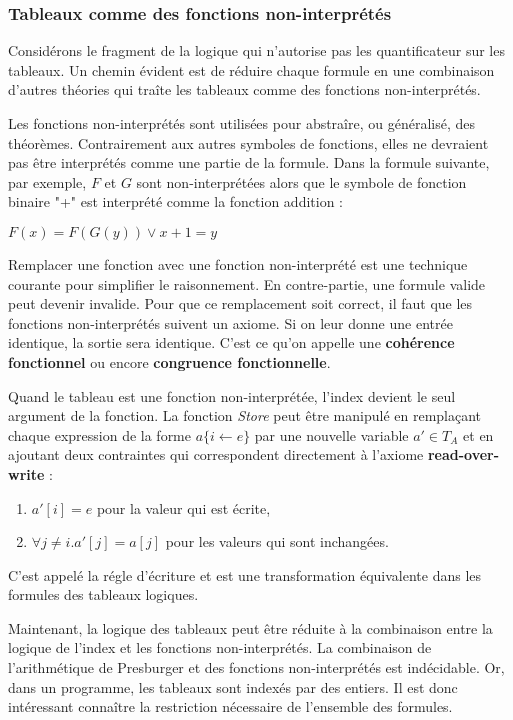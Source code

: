 \documentclass[9pt]{book}
\begin{document}
	\subsubsection{Tableaux comme des fonctions non-interpr\'et\'es}
	Consid\'erons le fragment de la logique qui n'autorise pas les quantificateur sur les tableaux. Un chemin \'evident est de r\'eduire chaque formule en une combinaison d'autres th\'eories qui tra\^ite les tableaux comme des fonctions non-interpr\'et\'es.\par
	Les fonctions non-interpr\'et\'es sont utilis\'ees pour abstra\^ire, ou g\'en\'eralis\'e, des th\'eor\`emes. Contrairement aux autres symboles de fonctions, elles ne devraient pas \^etre interpr\'et\'es comme une partie de la formule. Dans la formule suivante, par exemple, $F$ et $G$ sont non-interpr\'et\'ees alors que le symbole de fonction binaire "+" est interpr\'et\'e comme la fonction addition :\par
$F(x) = F(G(y)) \lor x+1=y$\par
Remplacer une fonction avec une fonction non-interpr\'et\'e est une technique courante pour simplifier le raisonnement.	En contre-partie, une formule valide peut devenir invalide. Pour que ce remplacement soit correct, il faut que les fonctions non-interpr\'et\'es suivent un axiome. Si on leur donne une entr\'ee identique, la sortie sera identique. C'est ce qu'on appelle une \textbf{coh\'erence fonctionnel} ou encore \textbf{congruence fonctionnelle}.\par
Quand le tableau est une fonction non-interpr\'et\'ee, l'index devient le seul argument de la fonction. La fonction \textit{Store} peut \^etre manipul\'e en rempla\c{c}ant chaque expression de la forme $a\{i\leftarrow e\}$ par une nouvelle variable $a'\in T_{A}$ et en ajoutant deux contraintes qui correspondent directement \`a l'axiome \textbf{read-over-write} :\par
\begin{enumerate}
\item $a'[i]=e$ pour la valeur qui est \'ecrite,
\item $\forall j\neq i. a'[j]=a[j]$ pour les valeurs qui sont inchang\'ees.
\end{enumerate}	
	
C'est appel\'e la r\'egle d'\'ecriture et est une transformation \'equivalente dans les formules des tableaux logiques.\par
Maintenant, la logique des tableaux peut \^etre r\'eduite \`a la combinaison entre la logique de l'index et les fonctions non-interpr\'et\'es. La combinaison de l'arithm\'etique de Presburger et des fonctions non-interpr\'et\'es est ind\'ecidable. Or, dans un programme, les tableaux sont index\'es par des entiers. Il est donc int\'eressant conna\^itre la restriction n\'ecessaire de l'ensemble des formules.\par
	
\end{document}

